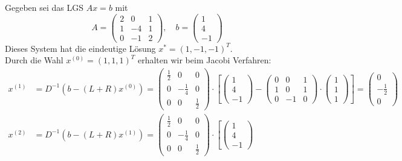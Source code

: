 \begin{egbox}
    Gegeben sei das LGS $Ax=b$ mit 
    \[A = \begin{pmatrix}
        2 & 0 & 1 \\ 1 & -4 & 1 \\ 0 & -1 & 2
    \end{pmatrix}, 
    \quad b=\begin{pmatrix}
        1 \\ 4 \\ -1
    \end{pmatrix}\]
    Dieses System hat die eindeutige Lösung $x^* = (1, -1, -1)^T$. \\
    Durch die Wahl $x^{(0)}=(1,1,1)^T$ erhalten wir beim Jacobi Verfahren:
    \begin{align*}
        x^{(1)} &= D^{-1}(b-(L+R)x^{(0)}) = \begin{pmatrix}
            \tfrac{1}{2} & 0 & 0 \\ 0 & -\tfrac{1}{4} & 0 \\ 0 & 0 & \tfrac{1}{2}
        \end{pmatrix} \cdot \left[\begin{pmatrix}
            1 \\ 4 \\ -1
        \end{pmatrix}-\begin{pmatrix}
            0 & 0 & 1 \\ 1 & 0 & 1 \\ 0 & -1 & 0
        \end{pmatrix}\cdot\begin{pmatrix}
            1 \\ 1 \\ 1
        \end{pmatrix}\right] = \begin{pmatrix}
            0 \\ -\tfrac{1}{2} \\ 0
        \end{pmatrix} \\
        x^{(2)} &= D^{-1}(b-(L+R)x^{(1)}) = \begin{pmatrix}
            \tfrac{1}{2} & 0 & 0 \\ 0 & -\tfrac{1}{4} & 0 \\ 0 & 0 & \tfrac{1}{2}
        \end{pmatrix} \cdot \left[\begin{pmatrix}
            1 \\ 4 \\ -1

\end{pmatrix}
\end{align*}
\end{egbox}
